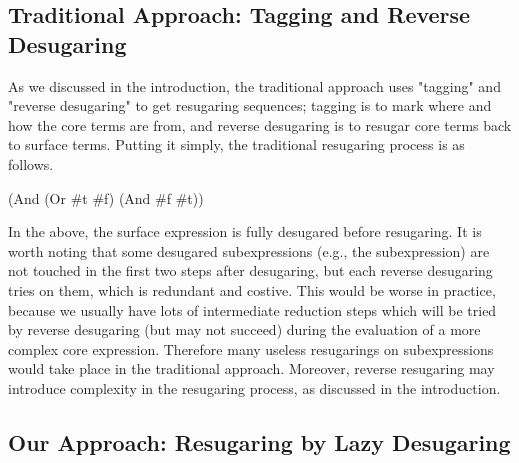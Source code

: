 \subsection{Traditional Approach: Tagging and Reverse Desugaring}

As we discussed in the introduction, the traditional approach uses "tagging" and "reverse desugaring" to get resugaring sequences; tagging is to mark where and how the core terms are from, and reverse desugaring is to resugar core terms back to surface terms. Putting it simply, the traditional resugaring process is as follows.

\begin{Codes}
    (And (Or \#t \#f) (And \#f \#t))
 
\end{Codes}

In the above, the surface expression is fully desugared before resugaring. It is worth noting that some desugared subexpressions (e.g., the  subexpression) are not touched in the first two steps after desugaring, but each reverse desugaring tries on them, which is redundant and costive. This would be worse in practice, because we usually have lots of intermediate reduction steps which will be tried by reverse desugaring (but  may not succeed) during the evaluation of a more complex core expression. Therefore many useless resugarings on subexpressions would take place in the traditional approach. Moreover, reverse resugaring may introduce complexity in the resugaring process, as discussed in the introduction.

\subsection{Our Approach: Resugaring by Lazy Desugaring}

